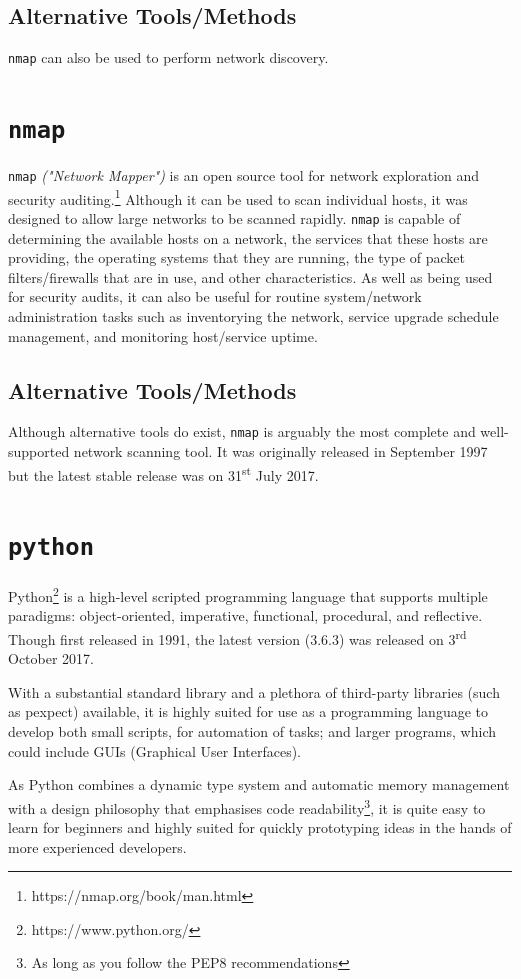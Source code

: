 \documentclass[12pt]{report}
\begin{document}
\subsection*{Alternative Tools/Methods}
\texttt{nmap} can also be used to perform network discovery.

\section{\texttt{nmap}}
\texttt{nmap} \textit{("Network Mapper")} is an open source tool for network exploration and security auditing.\footnote{https://nmap.org/book/man.html} Although it can be used to scan individual hosts, it was designed to allow large networks to be scanned rapidly. \texttt{nmap} is capable of determining the available hosts on a network, the services that these hosts are providing, the operating systems that they are running, the type of packet filters/firewalls that are in use, and other characteristics. As well as being used for security audits, it can also be useful for routine system/network administration tasks such as inventorying the network, service upgrade schedule management, and monitoring host/service uptime.
\subsection*{Alternative Tools/Methods}
Although alternative tools do exist, \texttt{nmap} is arguably the most complete and well-supported network scanning tool. It was originally released in September 1997 but the latest stable release was on 31\textsuperscript{st} July 2017.

\section{\texttt{python}}
Python\footnote{https://www.python.org/} is a high-level scripted programming language that supports multiple paradigms: object-oriented, imperative, functional, procedural, and reflective. Though first released in 1991, the latest version (3.6.3) was released on 3\textsuperscript{rd} October 2017.

With a substantial standard library and a plethora of third-party libraries (such as pexpect) available, it is highly suited for use as a programming language to develop both small scripts, for automation of tasks; and larger programs, which could include GUIs (Graphical User Interfaces).

As Python combines a dynamic type system and automatic memory management with a design philosophy that emphasises code readability\footnote{As long as you follow the PEP8 recommendations}, it is quite easy to learn for beginners and highly suited for quickly prototyping ideas in the hands of more experienced developers.
\end{document}
